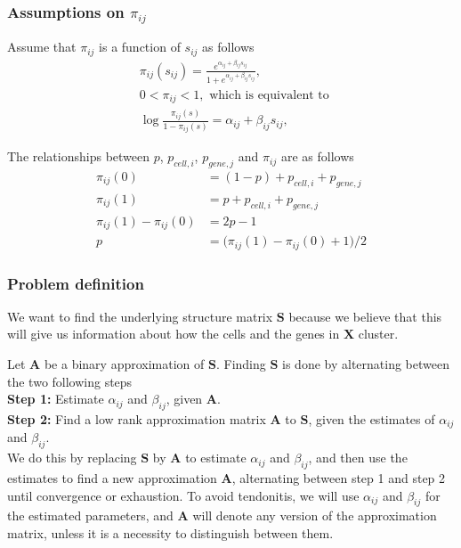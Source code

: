 \documentclass[12pt]{article}
\begin{document}
\subsubsection*{Assumptions on $\pi_{ij}$} %
Assume that $\pi_{ij}$ is a function of $s_{ij}$ as follows
\begin{align} \label{eq:Link}
  & \pi_{ij}(s_{ij}) = \frac{e^{\alpha_{ij} + \beta_{ij} s_{ij}}}{1 + e^{\alpha_{ij} + \beta_{ij} s_{ij}}}, \\
 &  0 < \pi_{ij} < 1, 
  \text{ which is equivalent to } \nonumber \\
   & \log \frac{\pi_{ij}(s)}{1-\pi_{ij}(s)}  = \alpha_{ij} + \beta_{ij} s_{ij},  \nonumber
\end{align}

The relationships between $p$, $ p_{cell, i}$, $ p_{gene,j}$ and $\pi_{ij}$ are as follows
\begin{align}
  \pi_{ij}(0) & = (1 - p) + p_{cell, i} + p_{gene,j} \\
  \pi_{ij}(1) & = p + p_{cell, i} + p_{gene,j} \label{eq:CellEffect}\\
   \pi_{ij}(1) -  \pi_{ij}(0) & = 2 p - 1 \\
  p&  = \big ( \pi_{ij}(1) -  \pi_{ij}(0) + 1 \big ) / 2 \label{eq:Effect}
\end{align}

\subsubsection*{Problem definition} %

We want to find the underlying structure matrix $\mathbf{S}$ because we believe that this will give us information about how the cells and the genes in $\mathbf{X}$ cluster. 

Let $\mathbf{A}$ be a binary approximation of $\mathbf{S}$.
Finding  $\mathbf{S}$ is done by alternating between the two following steps \\
{\bf Step 1:} Estimate $\alpha_{ij}$ and $\beta_{ij}$, given $\mathbf{A}$. \\
{\bf Step 2:} Find a low rank approximation matrix $\mathbf{A}$ to $\mathbf{S}$, given the estimates of $\alpha_{ij}$ and $\beta_{ij}$. \\
We do this by replacing $\mathbf{S}$ by $\mathbf{A}$ to estimate $\alpha_{ij}$ and $\beta_{ij}$, and then use the estimates to find a new approximation $\mathbf{A}$, alternating between step 1 and step 2 until convergence or exhaustion. 
To avoid tendonitis, we will use $\alpha_{ij}$ and $\beta_{ij}$ for the estimated parameters, and $\mathbf{A}$ will denote any version of the approximation matrix, unless it is a necessity to distinguish between them. 
\end{document}
